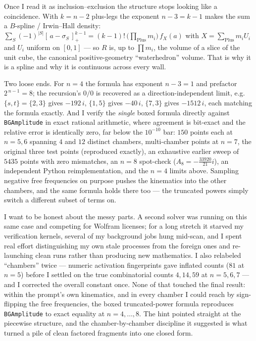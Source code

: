 \documentclass{article}
\newcommand{\pp}[1]{\left[\,#1\,\right]_{+}}
\begin{document}
Once I read it as inclusion--exclusion the structure stops looking like a
coincidence. With $k=n-2$ plus-legs the exponent $n-3=k-1$ makes the sum a
$B$-spline / Irwin--Hall density: $\sum_S(-1)^{|S|}\pp{a-\sigma_S}^{k-1}=
(k-1)!\,\big(\prod_{\mathrm{Plus}}m_i\big)\,f_X(a)$ with $X=\sum_{\mathrm{Plus}}
m_iU_i$ and $U_i$ uniform on $[0,1]$ --- so $R$ is, up to $\prod m_i$, the volume
of a slice of the unit cube, the canonical positive-geometry ``waterhedron''
volume. That is why it is a spline and why it is continuous across every wall.

Two loose ends. For $n=4$ the formula has exponent $n-3=1$ and prefactor
$2^{\,n-1}=8$; the recursion's $0/0$ is recovered as a direction-independent
limit, e.g.\ $\{s,t\}=\{2,3\}$ gives $-192\,i$, $\{1,5\}$ gives $-40\,i$,
$\{7,3\}$ gives $-1512\,i$, each matching the formula exactly. And I verify the
\emph{single} boxed formula directly against \texttt{BGAmplitude} in exact
rational arithmetic, where agreement is bit-exact and the relative error is
identically zero, far below the $10^{-10}$ bar: $150$ points each at $n=5,6$
spanning $4$ and $12$ distinct chambers, multi-chamber points at $n=7$, the
original three test points (reproduced exactly), an exhaustive earlier sweep of
$5435$ points with zero mismatches, an $n=8$ spot-check
($A_8=-\tfrac{33920}{21}i$), an independent Python reimplementation, and the
$n=4$ limits above. Sampling negative free frequencies on purpose pushes the
kinematics into the other chambers, and the same formula holds there too --- the
truncated powers simply switch a different subset of terms on.

I want to be honest about the messy parts. A second solver was running on this
same case and competing for Wolfram licenses; for a long stretch it starved my
verification kernels, several of my background jobs hung mid-scan, and I spent
real effort distinguishing my own stale processes from the foreign ones and
re-launching clean runs rather than producing new mathematics. I also relabeled
``chambers'' twice --- numeric activation fingerprints gave inflated counts
($81$ at $n=5$) before I settled on the true combinatorial counts $4,14,59$ at
$n=5,6,7$ --- and I corrected the overall constant once. None of that touched the
final result: within the prompt's own kinematics, and in every chamber I could
reach by sign-flipping the free frequencies, the boxed truncated-power formula
reproduces \texttt{BGAmplitude} to exact equality at $n=4,\dots,8$. The hint
pointed straight at the piecewise structure, and the chamber-by-chamber discipline
it suggested is what turned a pile of clean factored fragments into one closed form.
\end{document}
